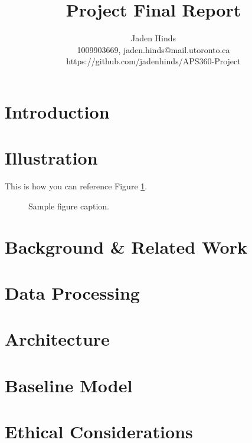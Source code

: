 \documentclass[final]{article}
\title{Project Final Report}
\author{%
  Jaden Hinds \\
  1009903669, jaden.hinds@mail.utoronto.ca\\
  https://github.com/jadenhinds/APS360-Project\\
}
\begin{document}
\maketitle

\vspace{-0.5in}

\section*{Introduction}

\section*{Illustration}
This is how you can reference Figure \ref{fig:sample}.

\begin{figure}[!h]
  \centering
  \fbox{\rule[-.5cm]{0cm}{4cm} \rule[-.5cm]{4cm}{0cm}}
  \caption{Sample figure caption.}
  \label{fig:sample}
\end{figure}

\section*{Background \& Related Work}

\section*{Data Processing}

\section*{Architecture}

\section*{Baseline Model}

\section*{Ethical Considerations}

\newpage
\nocite{*}
\end{document}
